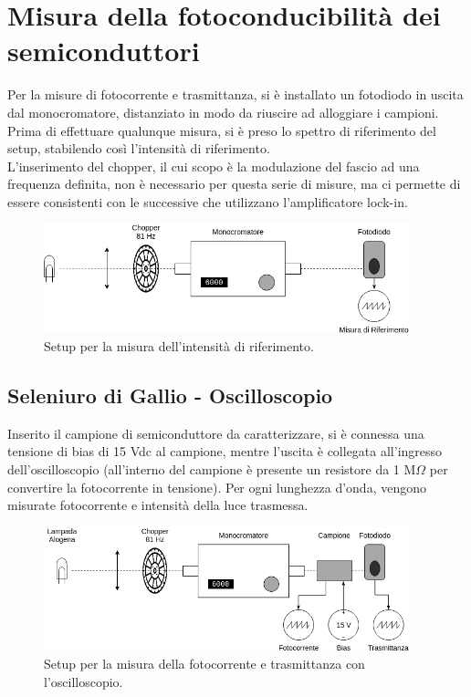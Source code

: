 \documentclass[11pt]{article} %
\begin{document}
\section{Misura della fotoconducibilità dei semiconduttori}
Per la misure di fotocorrente e trasmittanza, si è installato un fotodiodo in uscita dal monocromatore,  distanziato in modo da riuscire ad alloggiare i campioni. Prima di effettuare qualunque misura, si è preso lo spettro di riferimento del setup, stabilendo così l'intensità di riferimento.\\
L'inserimento del chopper, il cui scopo è la modulazione del fascio ad una frequenza definita, non è necessario per questa serie di misure, ma ci permette di essere consistenti con le successive che utilizzano l'amplificatore lock-in.
\begin{figure}[h!]
\begin{center}
\includegraphics[width=400px]{img/foto_rif.png}
\caption{Setup per la misura dell'intensità di riferimento.}
\end{center}
\end{figure}
\subsection{Seleniuro di Gallio - Oscilloscopio}
Inserito il campione di semiconduttore da caratterizzare, si è connessa una tensione di bias di 15 Vdc al campione, mentre l'uscita è collegata all'ingresso dell'oscilloscopio (all'interno del campione è presente un resistore da 1 M$\Omega$ per convertire la fotocorrente in tensione). Per ogni lunghezza d'onda, vengono misurate fotocorrente e intensità della luce trasmessa.
\begin{figure}[h!]
\begin{center}
\includegraphics[width=400px]{img/foto_osc.png}
\caption{Setup per la misura della fotocorrente e trasmittanza con l'oscilloscopio.}
\end{center}
\end{figure}
\end{document}
